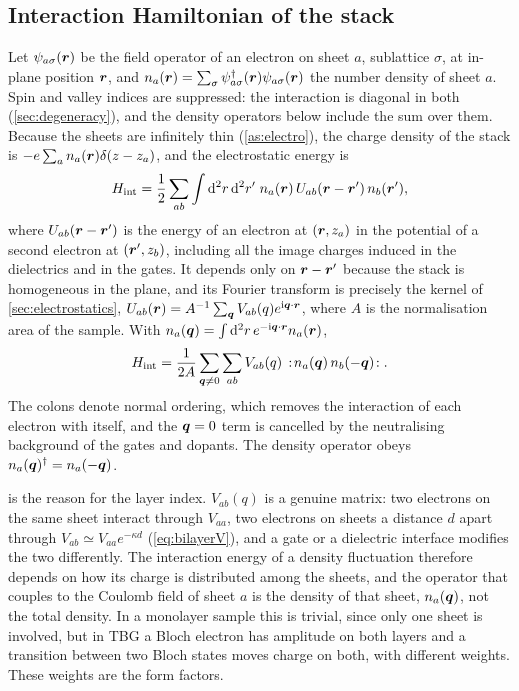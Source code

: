 \subsection{Interaction Hamiltonian of the stack}
\label{sec:hint}

Let $\psi_{a\sigma}(\bm r)$ be the field operator of an electron on sheet $a$, sublattice $\sigma$, at in-plane
position $\bm r$, and $n_a(\bm r)=\sum_\sigma\psi^\dagger_{a\sigma}(\bm r)\psi_{a\sigma}(\bm r)$ the number density of
sheet $a$. Spin and valley indices are suppressed: the interaction is diagonal in both
(\cref{sec:degeneracy}), and the density operators below include the sum over them. Because the sheets are
infinitely thin (\cref{as:electro}), the charge density of the stack is $-e\sum_an_a(\bm r)\delta(z-z_a)$, and
the electrostatic energy is
\begin{equation}
H_{\rm int}=\frac12\sum_{ab}\int\mathrm d^2r\,\mathrm d^2r'\;n_a(\bm r)\,U_{ab}(\bm r-\bm r')\,n_b(\bm r') ,
\label{eq:Hint_real}
\end{equation}
where $U_{ab}(\bm r-\bm r')$ is the energy of an electron at $(\bm r,z_a)$ in the potential of a second electron at
$(\bm r',z_b)$, including all the image charges induced in the dielectrics and in the gates. It depends only
on $\bm r-\bm r'$ because the stack is homogeneous in the plane, and its Fourier transform is precisely the
kernel of \cref{sec:electrostatics}, $U_{ab}(\bm r)=A^{-1}\sum_{\bm q}V_{ab}(q)e^{\mathrm i\bm q\cdot\bm r}$, where $A$ is the
normalisation area of the sample. With $n_a(\bm q)=\int\mathrm d^2r\,e^{-\mathrm i\bm q\cdot\bm r}n_a(\bm r)$,
\begin{equation}
H_{\rm int}=\frac1{2A}\sum_{\bm q\neq0}\sum_{ab}V_{ab}(q)\,:\!n_a(\bm q)\,n_b(-\bm q)\!: .
\label{eq:Hint}
\end{equation}
The colons denote normal ordering, which removes the interaction of each electron with itself, and the
$\bm q=0$ term is cancelled by the neutralising background of the gates and dopants. The density operator
obeys $n_a(\bm q)^\dagger=n_a(-\bm q)$.

 is the reason for the layer index. $V_{ab}(q)$ is a genuine matrix: two electrons on the same
sheet interact through $V_{aa}$, two electrons on sheets a distance $d$ apart through
$V_{ab}\simeq V_{aa}e^{-\kappa d}$ (\cref{eq:bilayerV}), and a gate or a dielectric interface modifies the
two differently. The interaction energy of a density fluctuation therefore depends on how its charge is
distributed among the sheets, and the operator that couples to the Coulomb field of sheet $a$ is the
density of that sheet, $n_a(\bm q)$, not the total density. In a monolayer sample this is trivial, since only one
sheet is involved, but in TBG a Bloch electron has amplitude on both layers and a transition between two
Bloch states moves charge on both, with different weights. These weights are the form factors.

